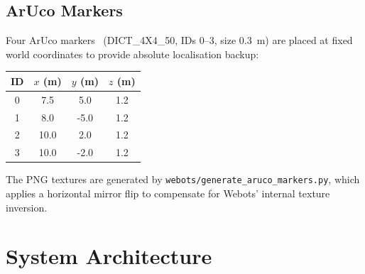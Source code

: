 \documentclass[12pt,a4paper]{article}
\begin{document}
\begin{center}
\end{center}

\subsection{ArUco Markers}

Four ArUco markers~\cite{aruco,aruco2} (DICT\_4X4\_50, IDs 0--3, size 0.3~m) are placed at fixed
world coordinates to provide absolute localisation backup:

\begin{center}
\begin{tabular}{cccc}
\toprule
ID & $x$ (m) & $y$ (m) & $z$ (m) \\
\midrule
0 &  7.5 &  5.0 & 1.2 \\
1 &  8.0 & -5.0 & 1.2 \\
2 & 10.0 &  2.0 & 1.2 \\
3 & 10.0 & -2.0 & 1.2 \\
\bottomrule
\end{tabular}
\end{center}

The PNG textures are generated by \texttt{webots/generate\_aruco\_markers.py},
which applies a horizontal mirror flip to compensate for Webots' internal
texture inversion.

\section{System Architecture}
\end{document}
